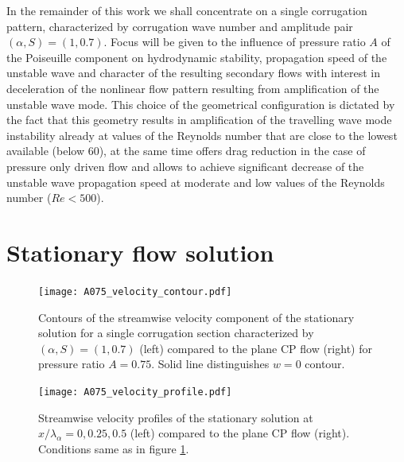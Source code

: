 \documentclass[lineno]{jfm}
\begin{document}
In the remainder of this work we shall concentrate on a single corrugation pattern, characterized by corrugation wave number and amplitude pair $(\alpha, S)=(1,0.7)$.
Focus will be given to the influence of pressure ratio $A$ of the Poiseuille component on hydrodynamic stability, propagation speed of the unstable wave and character of the resulting secondary flows with interest in deceleration of the nonlinear flow pattern resulting from amplification of the unstable wave mode.
This choice of the geometrical configuration is dictated by the fact that this geometry results in amplification of the travelling wave mode instability already at values of the Reynolds number that are close to the lowest available (below $60$), at the same time offers drag reduction in the case of pressure only driven flow \citep{Gepner2020b, Nikesh2017} and allows to achieve significant decrease of the unstable wave propagation speed at moderate and low values of the Reynolds number ($Re<500$).


\section{Stationary flow solution}\label{sec:2dflow}
\begin{figure}
\centering
 \texttt{[image: A075\_velocity\_contour.pdf]}  
 \caption{Contours of the streamwise velocity component of the stationary solution for a single corrugation section characterized by $(\alpha,S)=(1,0.7)$ (left) compared to the plane CP flow (right) for pressure ratio $A=0.75$. Solid line distinguishes $w=0$ contour.}
 \label{fig:streamwise_vel}
\end{figure}

\begin{figure}
\centering
 \texttt{[image: A075\_velocity\_profile.pdf]}  
 \caption{Streamwise velocity profiles of the stationary solution at $x/\lambda_\alpha=0, 0.25, 0.5$ (left) compared to the plane CP flow (right). Conditions same as in figure \ref{fig:streamwise_vel}.}
 \label{fig:streamwise_prof}
\end{figure}
\end{document}
